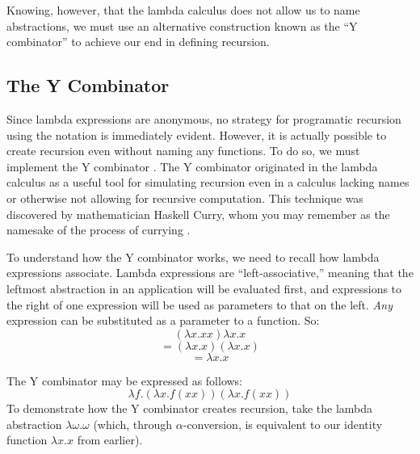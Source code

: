 \documentclass[twocolumn,titlepage,12pt]{article}
\begin{document}
Knowing, however, that the lambda calculus does not allow us to name abstractions, we must use an alternative construction known as the ``Y combinator'' to achieve our end in defining recursion.

\subsection{The Y Combinator}
Since lambda expressions are anonymous, no strategy for programatic recursion using the notation is immediately evident. However, it is actually possible to create recursion even without naming any functions. To do so, we must implement the Y combinator \cite{ycombmedium}. The Y combinator originated in the lambda calculus as a useful tool for simulating recursion even in a calculus lacking names or otherwise not allowing for recursive computation. This technique was discovered by mathematician Haskell Curry, whom you may remember as the namesake of the process of currying \cite{compphileyc}.

To understand how the Y combinator works, we need to recall how lambda expressions associate. Lambda expressions are ``left-associative,'' meaning that the leftmost abstraction in an application will be evaluated first, and expressions to the right of one expression will be used as parameters to that on the left. \textit{Any} expression can be substituted as a parameter to a function. So:
$$(\lambda x.xx)\lambda x.x$$
$$=(\lambda x.x)(\lambda x.x)$$
$$=\lambda x.x$$

The Y combinator may be expressed as follows:
$$\lambda f.(\lambda x.f(x x))(\lambda x.f(x x))$$
To demonstrate how the Y combinator creates recursion, take the lambda abstraction $\lambda \omega.\omega$ (which, through $\alpha$-conversion, is equivalent to our identity function $\lambda x.x$ from earlier).
\end{document}
